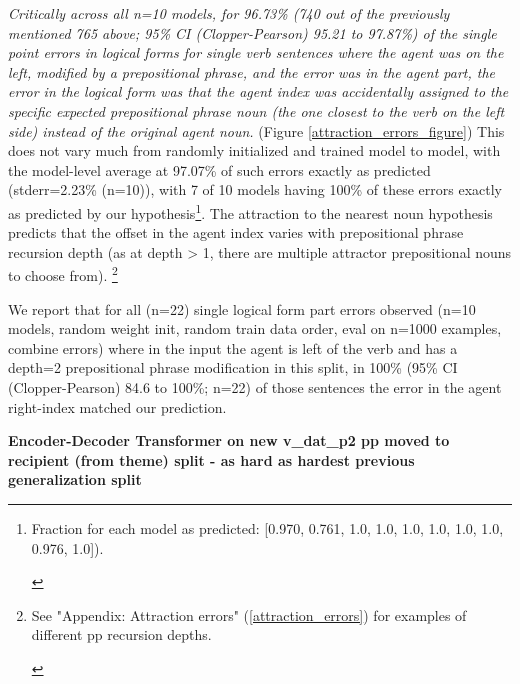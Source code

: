 \documentclass[11pt]{article}
\begin{document}
\textit{Critically across all n=10 \cite{Wu2023} models, for 96.73\% (740 out of the previously mentioned 765 above; 95\% CI (Clopper-Pearson) 95.21 to 97.87\%) of the single point errors in logical forms for single verb sentences where the agent was on the left, modified by a prepositional phrase, and the error was in the agent part, the error in the logical form was that the agent index was accidentally assigned to the specific expected prepositional phrase noun (the one closest to the verb on the left side) instead of the original agent noun.} (Figure \ref{attraction_errors_figure})
This does not vary much from randomly initialized and trained model to model, with the model-level average at 97.07\% of such errors exactly as predicted (stderr=2.23\% (n=10)), with 7 of 10 models having 100\% of these errors exactly as predicted by our hypothesis\footnote{\begin{footnotesize}Fraction for each model as predicted: [0.970, 0.761, 1.0, 
1.0, 1.0, 1.0, 1.0, 1.0, 0.976, 1.0]).
\end{footnotesize}
}.
The attraction to the nearest noun hypothesis predicts that the offset in the agent index varies with prepositional phrase recursion depth (as at depth > 1, there are multiple attractor prepositional nouns to choose from).
\footnote{\begin{footnotesize}See "Appendix: Attraction errors" (\ref{attraction_errors}) for examples of different pp recursion depths.
\end{footnotesize}
}

We report that for all (n=22) single logical form part errors observed (n=10 models, random weight init, random train data order, eval on n=1000 examples, combine errors) where in the input the agent is left of the verb and has a depth=2 prepositional phrase modification in this split, in 100\% (95\% CI (Clopper-Pearson) 84.6 to 100\%; n=22) of those sentences the error in the agent right-index matched our prediction.\label{error_analysis_for_baseline_transformer_predict_and_confirm_attraction_errors}

\textbf{\cite{Wu2023} Encoder-Decoder Transformer on new v\_dat\_p2 pp moved to recipient (from theme) split - as hard as hardest previous generalization split}
\end{document}

